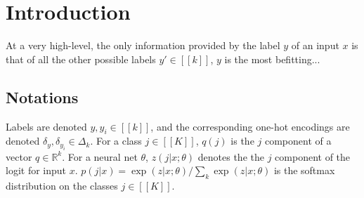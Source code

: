 \section{Introduction}
At a very high-level, the only information provided by the label $y$ of an input
$x$ is that of all the other possible labels $y' \in [\![k]\!]$, $y$ is the most
befitting...

\subsection{Notations}
Labels are
denoted $y, y_i \in [\![k]\!]$, and the corresponding one-hot encodings are
denoted $\delta_{y},\delta_{y_i} \in \Delta_k$. For a class $j \in [\![K]\!]$,
$q(j)$ is the $j$ component of a vector $q \in \mathbb R^k$. For a neural net
$\theta$, $z(j|x;\theta)$ denotes the the $j$ component of the logit for input
$x$. $p(j|x)=\exp(z|x;\theta)/\sum_{k}\exp(z|x;\theta)$ is the softmax
distribution on the classes $j \in [\![K]\!]$.

